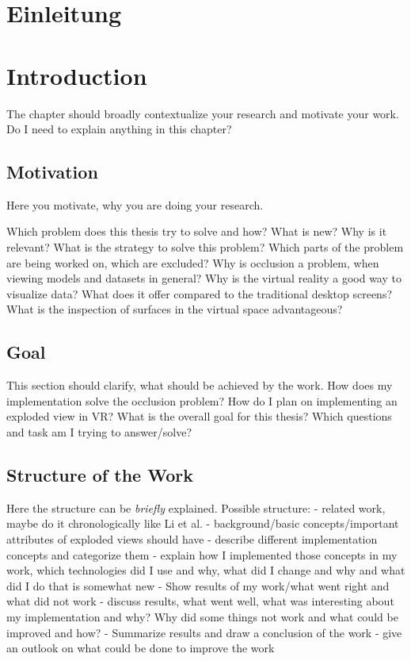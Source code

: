 {\chapter{Einleitung}}
{\chapter{Introduction}}

\label{sec:introduction}
The chapter should broadly contextualize your research and motivate your work.
Do I need to explain anything in this chapter?

\section{Motivation}
Here you motivate, why you are doing your research.

Which problem does this thesis try to solve and how? What is new? Why is it relevant? What is the strategy to solve this problem? Which parts of the problem are  being worked on, which are excluded? 
Why is occlusion a problem, when viewing models and datasets in general? 
Why is the virtual reality a good way to visualize data? What does it offer compared to the traditional desktop screens?
What is the inspection of surfaces in the virtual space advantageous?

\section{Goal}
This section should clarify, what should be achieved by the work.
How does my implementation solve the occlusion problem?
How do I plan on implementing an exploded view in VR? What is the overall goal for this thesis?
Which questions and task am I trying to answer/solve?

\section{Structure of the Work}
Here the structure can be \emph{briefly} explained.
Possible structure:
- related work, maybe do it chronologically  like Li et al. 
- background/basic concepts/important attributes of exploded views should have
- describe different implementation concepts and categorize them
- explain how I implemented those concepts in my work, which technologies did I use and why, what did I change and why and what did I do that is somewhat new
- Show results of my work/what went right and what did not work
- discuss results, what went well, what was interesting about my implementation and why? Why did some things not work and what could be improved and how? 
- Summarize results and draw a conclusion of the work 
- give an outlook on what could be done to improve the work


